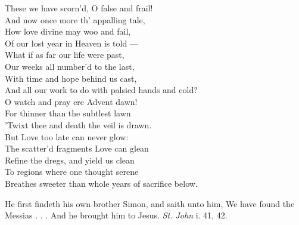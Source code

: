   These we have scorn’d, O false and frail! \\
 And now once more th’ appalling tale, \\
 How love divine may woo and fail, \\
 Of our lost year in Heaven is told — \\
 What if as far our life were past, \\
 Our weeks all number’d to the last, \\
 With time and hope behind us cast, \\
 And all our work to do with palsied hands and cold? \\
  O watch and pray ere Advent dawn! \\
 For thinner than the subtlest lawn \\
 ’Twixt thee and death the veil is drawn. \\
 But Love too late can never glow: \\
 The scatter’d fragments Love can glean \\
 Refine the dregs, and yield us clean \\
 To regions where one thought serene \\
 Breathes sweeter than whole years of sacrifice below.\\


He first findeth his own brother Simon, and saith unto him, We have found the Messias . . . And he brought him to Jesus. \emph{St. John} i. 41, 42.


